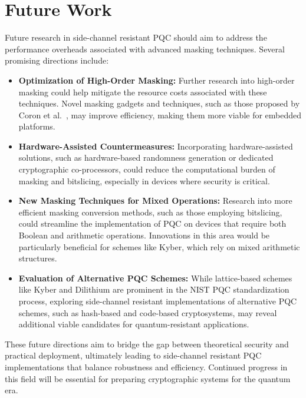 \section{Future Work}

Future research in side-channel resistant \ac{PQC} should aim to address the performance overheads associated with advanced masking techniques. Several promising directions include:
\begin{itemize}
    \item \textbf{Optimization of High-Order Masking:} Further research into high-order masking could help mitigate the resource costs associated with these techniques. Novel masking gadgets and techniques, such as those proposed by Coron et al.\ \cite{Coron23}, may improve efficiency, making them more viable for embedded platforms.
    \item \textbf{Hardware-Assisted Countermeasures:} Incorporating hardware-assisted solutions, such as hardware-based randomness generation or dedicated cryptographic co-processors, could reduce the computational burden of masking and bitslicing, especially in devices where security is critical.
    \item \textbf{New Masking Techniques for Mixed Operations:} Research into more efficient masking conversion methods, such as those employing bitslicing, could streamline the implementation of \ac{PQC} on devices that require both Boolean and arithmetic operations. Innovations in this area would be particularly beneficial for schemes like Kyber, which rely on mixed arithmetic structures.
    \item \textbf{Evaluation of Alternative \ac{PQC} Schemes:} While lattice-based schemes like Kyber and Dilithium are prominent in the \ac{NIST} \ac{PQC} standardization process, exploring side-channel resistant implementations of alternative \ac{PQC} schemes, such as hash-based and code-based cryptosystems, may reveal additional viable candidates for quantum-resistant applications.
\end{itemize}

These future directions aim to bridge the gap between theoretical security and practical deployment, ultimately leading to side-channel resistant \ac{PQC} implementations that balance robustness and efficiency. Continued progress in this field will be essential for preparing cryptographic systems for the quantum era.
